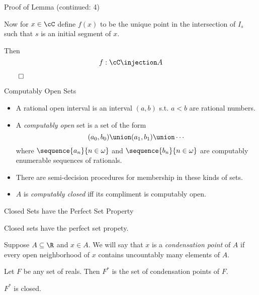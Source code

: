 \begin{frame}{Proof of Lemma (continued: 4)}

Now for $x\in\cC$ define $f(x)$ to be the unique point in the
intersection of $I_s$ such that $s$ is an initial segment of $x$.

Then
$$f : \cC \injection A$$


$\qed$

\end{frame}

\begin{frame}{Computably Open Sets}

\begin{definition}
\begin{itemize}
  \item A rational open interval is an interval $(a, b)$ s.t.
        $a<b$ are rational numbers.
  \item A \emph{computably open} set is a set of the form
  $$(a_0, b_0) \union (a_1, b_1) \union \cdots$$
  where $\sequence{a_n}{n\in\omega}$ and
  $\sequence{b_n}{n\in\omega}$ are computably enumerable
  sequences of rationals.
  \item There are semi-decision procedures for membership in these kinds
  of sets.
  \item $A$ is \emph{computably closed} iff its compliment is computably open.
\end{itemize}
\end{definition}

\end{frame}

\begin{frame}{Closed Sets have the Perfect Set Property}

\begin{theorem}
Closed sets have the perfect set propety.
\end{theorem}

\begin{definition}
Suppose $A\subseteq \R$ and $x\in A$. We will say that $x$ is a
\emph{condensation point} of $A$ if every open neighborhood of $x$ contains
uncountably many elements of $A$.
\end{definition}

\begin{definition}
Let $F$ be any set of reals. Then $F^*$ is the set of condensation points
of $F$.
\end{definition}

\begin{observation}
$F^*$ is closed.
\end{observation}

\end{frame}

